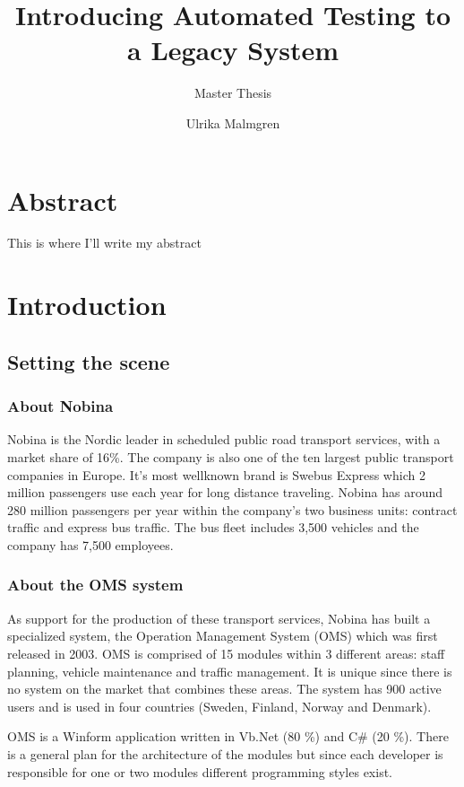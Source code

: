 \documentclass{article}
\title{Introducing Automated Testing to a Legacy System}
\subtitle{Master Thesis}
\author{Ulrika Malmgren}
\begin{document}
	\maketitle
	\newpage


	\section*{Abstract}
	This is where I'll write my abstract
	\newpage 

	\tableofcontents
	\newpage


	\section{Introduction}
	\subsection{Setting the scene}
		\subsubsection{About Nobina}
		Nobina is the Nordic leader in scheduled public road transport services, with a market share of 16\%.
		The company is also one of the ten largest public transport companies in Europe. It's most wellknown brand is Swebus Express which 2 million passengers use each year for long distance
		traveling. Nobina has around 280 million passengers per year within the company’s two business units: contract traffic and express bus traffic. The bus fleet includes 3,500 vehicles and the company has 7,500 employees.

		\subsubsection{About the OMS system}
		As support for the production of these transport services, Nobina has built a specialized system, the Operation Management System (OMS) which was first released in 2003. OMS is comprised of 15 modules within 3 different areas: staff planning, vehicle maintenance and traffic management. It is unique since there is no system on the market that combines these areas. The system has 900 active users and is used in four countries (Sweden, Finland, Norway and Denmark).

		OMS is a Winform application written in Vb.Net (80 \%) and C\# (20 \%). There is a general plan for the architecture of the modules but since each developer is responsible for one or two modules different programming styles exist.
\end{document}

